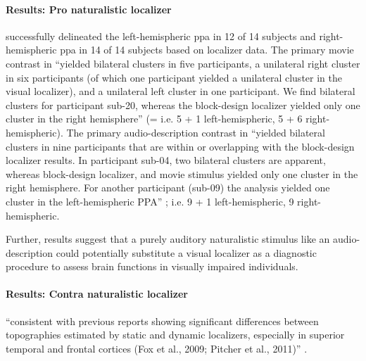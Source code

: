 \paragraph{Results: Pro naturalistic localizer}


\citet{sengupta2016extension} successfully delineated the left-hemispheric
\ac{ppa} in 12 of 14 subjects and right-hemispheric \ac{ppa} in 14 of 14
subjects based on localizer data.
%
The primary movie contrast in \citet{haeusler2022processing} ``yielded bilateral
clusters in five participants, a unilateral right cluster in six participants
(of which one participant yielded a unilateral cluster in the visual localizer),
and a unilateral left cluster in one participant.
%
We find bilateral clusters for participant sub-20, whereas the block-design
localizer yielded only one cluster in the right hemisphere''
\citep{haeusler2022processing} (= i.e. 5 + 1 left-hemispheric, 5 + 6
right-hemispheric).
%
The primary audio-description contrast in \citet{haeusler2022processing}
``yielded bilateral clusters in nine participants that are within or overlapping
with the block-design localizer results.
%
In participant sub-04, two bilateral clusters are apparent, whereas block-design
localizer, and movie stimulus yielded only one cluster in the right hemisphere.
%
For another participant (sub-09) the analysis yielded one cluster in the
left-hemispheric PPA'' \citep{haeusler2022processing}; i.e. 9 + 1
left-hemispheric, 9 right-hemispheric.


Further, results suggest that a purely auditory naturalistic stimulus like an
audio-description could potentially substitute a visual localizer as a
diagnostic procedure to assess brain functions in visually impaired individuals.






\paragraph{Results: Contra naturalistic localizer}



``consistent with previous reports showing significant differences between
topographies estimated by static and dynamic localizers, especially in superior
temporal and frontal cortices (Fox et al., 2009; Pitcher et al., 2011)''
\citep{jiahui2022cross}.

